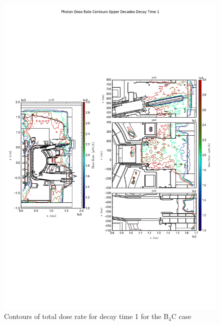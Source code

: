 \documentclass[12pt]{article}
\begin{document}
\begin{figure}[ht!]
\centering
\includegraphics[trim={0cm 8cm, 0cm 8cm},clip,scale=0.6]{../plots/final_model_with_b4c/Photon_Dose_Rate_Contours_Upper_Decades_Decay_Time_1.png}
\caption{Contours of total dose rate for decay time 1 for the B$_4$C case}
\label{fig:photons_dc1_b4c_contours}
\end{figure}
\newpage
\clearpage
\end{document}
